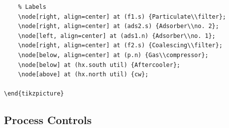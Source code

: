\documentclass[11pt]{article}
\begin{document}
\begin{enumerate}[resume*]
\begin{lstlisting}
	% Labels
	\node[right, align=center] at (f1.s) {Particulate\\filter};
	\node[right, align=center] at (ads2.s) {Adsorber\\no. 2};
	\node[left, align=center] at (ads1.n) {Adsorber\\no. 1};
	\node[right, align=center] at (f2.s) {Coalescing\\filter};
	\node[below, align=center] at (p.n) {Gas\\compressor};
	\node[below] at (hx.south util) {Aftercooler};
	\node[above] at (hx.north util) {cw};
	
\end{tikzpicture}
\end{lstlisting}
\end{enumerate}


\subsection{Process Controls}
\end{document}

